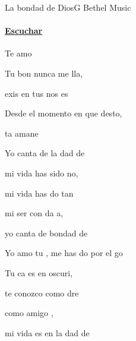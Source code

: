\documentclass[12pt, spanish]{book}
\newcommand{\NotCCLIed}{\relax}
\begin{document}
    \begin{song}{La bondad de Dios}{G}
        {} %
        {Bethel Music}
        {} %
        {} %
        \ifChordBk
        \paragraph{\mbox{}\hfill\protect\href{https://open.spotify.com/intl-es/track/0HE3SH6fvxdRIUq54HjVq0}{Escuchar}\mbox{}\hfill}
        \fi



        \begin{SBOpGroup}
            Te amo 

            Tu bon nunca me lla,

             exis en tus nos es

            Desde el momento en que desto,

            ta  amane

            Yo canta de la dad de 
        \end{SBOpGroup}

        \begin{SBChorus}
             mi vida has sido no,

             mi vida has do tan 

             mi ser con da a,

            yo canta de  bondad de 
        \end{SBChorus}

        \begin{SBOpGroup}
            Yo amo tu , me has do por el go

            Tu ca es en  oscuri,

            te conozco como dre

             como amigo ,

            mi vida es en la dad de 
        \end{SBOpGroup}


\end{song}
\end{document}
